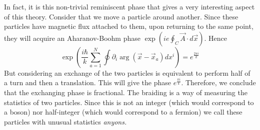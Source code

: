 \documentclass{article}
\begin{document}
In fact, it is this non-trivial reminiscent phase that gives a very interesting aspect of this theory. Consider that we move a particle around another. Since these particles have magnetic flux attached to them, upon returning to the same point, they will acquire an Aharanov-Boohm phase $\exp\left(ie\oint_C\vec{A}\cdot d\vec{x}\right)$. Hence 
\begin{equation}
	\exp\left(\frac{i\hbar}{k}\sum_{a=1}^{N}\oint\partial_i\arg(\vec{x}-\vec{x}_a)dx^i\right)=e^{\frac{2\pi i}{k}}
\end{equation}
But considering an exchange of the two particles is equivalent to perform half of a turn and then a translation. This will give the phase $e^{\frac{\pi i}{k}}$. Therefore, we conclude that the exchanging phase is fractional. The braiding is a way of measuring the statistics of two particles. Since this is not an integer (which would correspond to a boson) nor half-integer (which would correspond to a fermion) we call these particles with unusual statistics \textit{anyons.}



\end{document}
